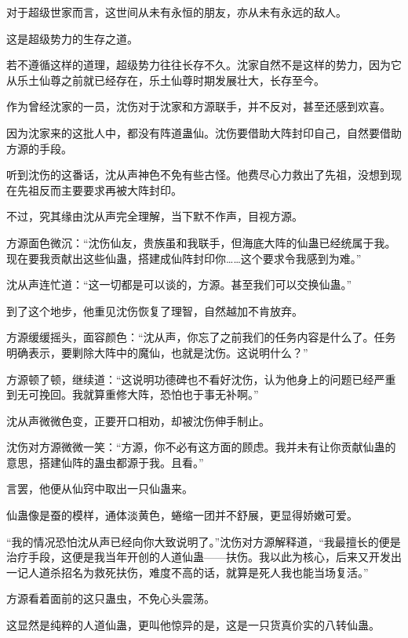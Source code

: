 
\begin{this_body}

对于超级世家而言，这世间从未有永恒的朋友，亦从未有永远的敌人。

这是超级势力的生存之道。

若不遵循这样的道理，超级势力往往长存不久。沈家自然不是这样的势力，因为它从乐土仙尊之前就已经存在，乐土仙尊时期发展壮大，长存至今。

作为曾经沈家的一员，沈伤对于沈家和方源联手，并不反对，甚至还感到欢喜。

因为沈家来的这批人中，都没有阵道蛊仙。沈伤要借助大阵封印自己，自然要借助方源的手段。

听到沈伤的这番话，沈从声神色不免有些古怪。他费尽心力救出了先祖，没想到现在先祖反而主要要求再被大阵封印。

不过，究其缘由沈从声完全理解，当下默不作声，目视方源。

方源面色微沉：“沈伤仙友，贵族虽和我联手，但海底大阵的仙蛊已经统属于我。现在要我贡献出这些仙蛊，搭建成仙阵封印你……这个要求令我感到为难。”

沈从声连忙道：“这一切都是可以谈的，方源。甚至我们可以交换仙蛊。”

到了这个地步，他重见沈伤恢复了理智，自然越加不肯放弃。

方源缓缓摇头，面容颜色：“沈从声，你忘了之前我们的任务内容是什么了。任务明确表示，要剿除大阵中的魔仙，也就是沈伤。这说明什么？”

方源顿了顿，继续道：“这说明功德碑也不看好沈伤，认为他身上的问题已经严重到无可挽回。我就算重修大阵，恐怕也于事无补啊。”

沈从声微微色变，正要开口相劝，却被沈伤伸手制止。

沈伤对方源微微一笑：“方源，你不必有这方面的顾虑。我并未有让你贡献仙蛊的意思，搭建仙阵的蛊虫都源于我。且看。”

言罢，他便从仙窍中取出一只仙蛊来。

仙蛊像是蚕的模样，通体淡黄色，蜷缩一团并不舒展，更显得娇嫩可爱。

“我的情况恐怕沈从声已经向你大致说明了。”沈伤对方源解释道，“我最擅长的便是治疗手段，这便是我当年开创的人道仙蛊——扶伤。我以此为核心，后来又开发出一记人道杀招名为救死扶伤，难度不高的话，就算是死人我也能当场复活。”

方源看着面前的这只蛊虫，不免心头震荡。

这显然是纯粹的人道仙蛊，更叫他惊异的是，这是一只货真价实的八转仙蛊。


\end{this_body}
